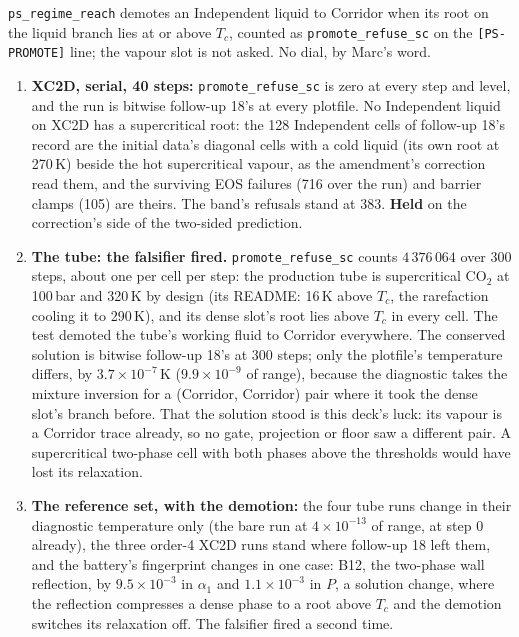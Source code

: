 \documentclass[11pt,a4paper]{article}
\newcommand{\code}[1]{\texttt{\small #1}}
\begin{document}
\code{ps\_regime\_reach} demotes an Independent liquid to Corridor when
its root on the liquid branch lies at or above $T_c$, counted as
\code{promote\_refuse\_sc} on the \code{[PS-PROMOTE]} line; the vapour
slot is not asked.  No dial, by Marc's word.
\begin{enumerate}[nosep]
\item \textbf{XC2D, serial, 40 steps:} \code{promote\_refuse\_sc} is
      zero at every step and level, and the run is bitwise follow-up
      18's at every plotfile.  No Independent liquid on XC2D has a
      supercritical root: the 128 Independent cells of follow-up 18's
      record are the initial data's diagonal cells with a cold liquid
      (its own root at 270\,K) beside the hot supercritical vapour, as
      the amendment's correction read them, and the surviving EOS
      failures (716 over the run) and barrier clamps (105) are theirs.
      The band's refusals stand at 383.  \textbf{Held} on the
      correction's side of the two-sided prediction.
\item \textbf{The tube: the falsifier fired.}  \code{promote\_refuse\_sc}
      counts $4\,376\,064$ over 300 steps, about one per cell per step:
      the production tube is supercritical CO$_2$ at 100\,bar and
      320\,K by design (its README: 16\,K above $T_c$, the rarefaction
      cooling it to 290\,K), and its dense slot's root lies above $T_c$
      in every cell.  The test demoted the tube's working fluid to
      Corridor everywhere.  The conserved solution is bitwise follow-up
      18's at 300 steps; only the plotfile's temperature differs, by
      $3.7\times10^{-7}$\,K ($9.9\times10^{-9}$ of range), because the
      diagnostic takes the mixture inversion for a (Corridor, Corridor)
      pair where it took the dense slot's branch before.  That the
      solution stood is this deck's luck: its vapour is a Corridor trace
      already, so no gate, projection or floor saw a different pair.  A
      supercritical two-phase cell with both phases above the thresholds
      would have lost its relaxation.
\item \textbf{The reference set, with the demotion:} the four tube
      runs change in their diagnostic temperature only (the bare run at
      $4\times10^{-13}$ of range, at step 0 already), the three order-4
      XC2D runs stand where follow-up 18 left them, and the battery's
      fingerprint changes in one case: B12, the two-phase wall
      reflection, by $9.5\times10^{-3}$ in $\alpha_1$ and
      $1.1\times10^{-3}$ in $P$, a solution change, where the reflection
      compresses a dense phase to a root above $T_c$ and the demotion
      switches its relaxation off.  The falsifier fired a second time.
\end{enumerate}
\end{document}
